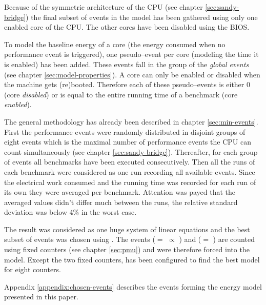 Because of the symmetric architecture of the CPU (see chapter
\ref{sec:sandy-bridge}) the final subset of events in the model has been
gathered using only one enabled core of the CPU. The other cores have been
disabled using the BIOS.

To model the baseline energy of a core (the energy consumed when no performance
event is triggered), one pseudo--event per core (modeling the time it is
enabled) has been added. These events fall in the group of the \emph{global
events} (see chapter \ref{sec:model-properties}). A core can only be enabled or
disabled when the machine gets (re)booted. Therefore each of these
pseudo--events is either $0$ (core \emph{disabled}) or is equal to the entire
running time of a benchmark (core \emph{enabled}).

The general methodology has already been described in chapter
\ref{sec:min-events}.  First the performance events were randomly
distributed in disjoint groups of eight events which is the maximal number of
performance events the CPU can count simultaneously (see chapter
\ref{sec:sandy-bridge}). Thereafter, for each group of events all benchmarks
have been executed consecutively. Then all the runs of each benchmark were
considered as one run recording all available events. Since the electrical
work consumed and the running time was recorded for each run of its own they
were averaged per benchmark. Attention was payed that the averaged values didn't
differ much between the runs, the relative standard deviation was below 4\% in
the worst case.

The result was considered as one huge system of linear equations and the best
subset of events was chosen using \JWTleaps{}. The events \JWctrCLK{} ($=$
 $\propto$
) and \JWctrINST{} ($=$
) are counted using fixed counters (see chapter
\ref{sec:pmu}) and were therefore forced into the model. Except the two fixed
counters, \JWTleaps{} has been configured to find the best model for eight
counters.

Appendix \ref{appendix:chosen-events} describes the events forming the energy
model presented in this paper.


\label{sec:final-model}

